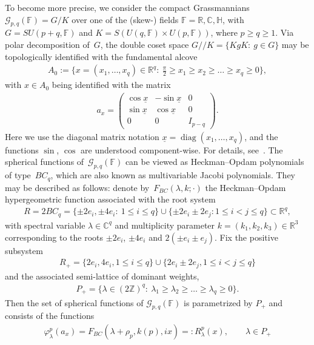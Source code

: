 \documentclass[11pt]{article}
\numberwithin{equation}{section}
\DeclareMathOperator{\diag}{diag}
\begin{document}
To become more precise, we consider the compact Grassmannians $\mathcal G_{p,q}(\mathbb F)=G/K$ over one of the (skew-)
f\/ields $\mathbb F= \mathbb R, \mathbb C, \mathbb H$, with $G=SU(p+q,\mathbb F)$ and $K=S(U(q, \mathbb F)\times
U(p,\mathbb F))$, where $p\ge q\ge 1$.
Via polar decomposition of~$G$, the double coset space $G//K=\{KgK:\> g\in G\}$ may be topologically identif\/ied with the
fundamental alcove
\begin{gather*}
A_0:=\Big\{x=(x_1,\ldots,x_q)\in\mathbb R^q:\> \frac{\pi}{2}\ge x_1\ge x_2\ge\dots\ge x_q\ge0\Big\},
\end{gather*}
with $x\in A_0$ being identif\/ied with the matrix
\begin{gather*}
a_x=
\begin{pmatrix}
\cos\underline x & -\sin \underline x & 0
\\
\sin \underline x & \cos \underline x & 0
\\
0 & 0 & I_{p-q}
\end{pmatrix}
.
\end{gather*}
Here we use the diagonal matrix notation $\underline x=\diag(x_1,\ldots,x_q)$, and the functions $\sin$, $\cos$ are
understood component-wise.
For details, see~\cite[Theorem~4.1]{RR}.
The spherical functions of~$\mathcal G_{p,q}(\mathbb F)$ can be viewed as Heckman--Opdam polynomials of type~$BC_q$,
which are also known as multivariable Jacobi polynomials.
They may be described as follows: denote by~$F_{BC}(\lambda,k;\cdot)$ the Heckman--Opdam hypergeometric function
associated with the root system
\begin{gather*}
R=2  BC_q=\{\pm 2e_i, \pm 4 e_i: \> 1\leq i\le q\}\cup\{\pm 2e_i \pm 2e_j: 1\leq i < j \leq q\} \subset \mathbb R^q,
\end{gather*}
with spectral variable $\lambda\in\mathbb C^q$ and multiplicity parameter $k=(k_1, k_2, k_3)\in \mathbb R^3$
corresponding to the roots $\pm 2 e_i$, $\pm 4 e_i$ and $2(\pm e_i\pm e_j)$.
Fix the positive subsystem
\begin{gather*}
R_+=\{2e_i, 4e_i, 1\leq i \leq q\}\cup\{2e_i\pm 2e_j, 1\leq i<j \leq q\}
\end{gather*}
and the associated semi-lattice of dominant weights,
\begin{gather*}
P_+=\big\{\lambda\in (2\mathbb Z)^q: \> \lambda_1\ge\lambda_2\ge\dots\ge\lambda_q\ge0\big\}.
\end{gather*}
Then the set of spherical functions of $\mathcal G_{p,q}(\mathbb F)$ is parametrized by $P_+$ and consists of the
functions
\begin{gather}
\label{jacobi-pol-def}
\varphi_\lambda^p(a_x)=F_{BC}(\lambda+\rho_p, k(p),ix)=: R_\lambda^p(x),
\qquad
\lambda\in P_+
\end{gather}
\end{document}
